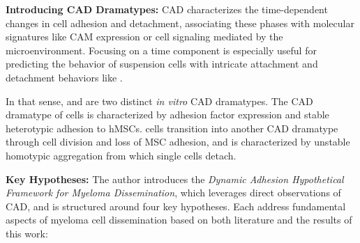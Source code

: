 \textbf{Introducing CAD Dramatypes:}
\acf{CAD} characterizes the time-dependent changes in cell
adhesion and detachment, associating these phases with molecular signatures like
\ac{CAM} expression or cell signaling mediated by the microenvironment. Focusing
on a time component is especially useful for predicting the behavior of
suspension cells with intricate attachment and detachment behaviors like \INA.

In that sense, \MAina and \nMAina are two distinct \textit{in vitro} \ac{CAD}
dramatypes. The \ac{CAD} dramatype of \MAina cells is characterized by adhesion
factor expression and stable heterotypic adhesion to \acp{hMSC}. \MAina cells
transition into another \ac{CAD} dramatype \dashed{\nMAina} through cell
division and loss of MSC adhesion, and is characterized by unstable homotypic
aggregation from which single cells detach.


\textbf{Key Hypotheses:}
The author introduces the \emph{Dynamic Adhesion Hypothetical Framework for
      Myeloma Dissemination}, which leverages direct observations of
\ac{CAD}, and is structured around four key hypotheses. Each
address fundamental aspects of myeloma cell dissemination based on both
literature and the results of this work:



\newcommand{\caddramatype}{ %
      Myeloma cells change \ac{CAD} dramatypes\footref{foot:caddt} in response to
      different environmental cues faced during dissemination. Each step in
      dissemination
      potentially involves a different \ac{CAD}
      dramatype %
}
\newcommand{\caddramatypetitle}{ %
      \textit{Hypothesis 1}: Change of Adhesion Dramatypes during Dissemination%
}%


\newcommand{\cadplasticity}{ %
      High \ac{CAD} plasticity is a hallmark of aggressive myeloma %
}%
\newcommand{\cadplasticitytitle}{ %
      \textit{Hypothesis 2}: High CAD Plasticity is a Hallmark of
      Aggressive Myeloma %
}%


\newcommand{\cadddiversity}{%
      \ac{CAD} is highly diverse within both patients and cell lines %
}%
\newcommand{\cadddiversitytitle}{ %
      \textit{Hypothesis 3}: CAD is Highly Diverse Within both Patients
      and Cell Lines%
}%


\newcommand{\caddtrigger}{%
      Detachment is caused by multiple cues of varying nature, including
      external mechanical forces, cell division, loss of \ac{CAM} expression, or
      even pure chance. }%
\newcommand{\caddtriggertitle}{ %
      \textit{Hypothesis 4}: Detachment is Caused by Multiple Cues of Varying
      Nature %
}%



